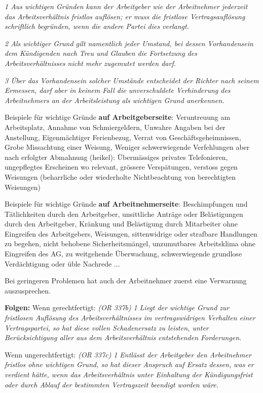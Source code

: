 \begin{description}
  \textit{1 Aus wichtigen Gründen kann der Arbeitgeber wie der Arbeitnehmer jederzeit das Arbeitsverhältnis fristlos auflösen; er muss die fristlose Vertragsauflösung schriftlich begründen, wenn die andere Partei dies verlangt.}

  \textit{2 Als wichtiger Grund gilt namentlich jeder Umstand, bei dessen Vorhandensein dem Kündigenden nach Treu und Glauben die Fortsetzung des Arbeitsverhältnisses nicht mehr zugemutet werden darf.}

  \textit{3 Über das Vorhandensein solcher Umstände entscheidet der Richter nach seinem Ermessen, darf aber in keinem Fall die unverschuldete Verhinderung des Arbeitnehmers an der Arbeitsleistung als wichtigen Grund anerkennen.}

  Beispiele für wichtige Gründe \textbf{auf Arbeitgeberseite}: Veruntreuung am Arbeitsplatz, Annahme von Schmiergeldern, Unwahre Angaben bei der Anstellung, Eigenmächtiger Ferienbezug, Verrat von Geschäftsgeheimnissen, Grobe Missachtung einer Weisung, Weniger schwerwiegende Verfehlungen aber nach erfolgter Abmahnung (heikel): Übermässiges privates Telefonieren, ungepflegtes Erscheinen wo relevant, grössere Verspätungen, verstoss gegen Weisungen (beharrliche oder wiederholte Nichtbeachtung von berechtigten Weisungen)

  Beispiele für wichtige Gründe \textbf{auf Arbeitnehmerseite}: Beschimpfungen und Tätlichkeiten durch den Arbeitgeber, unsittliche Anträge oder Belästigungen durch den Arbeitgeber, Kränkung und Belästigung durch Mitarbeiter ohne Eingreifen des Arbeitgebers, Weisungen, sittenwidrige oder strafbare Handlungen zu begehen, nicht behobene Sicherheitsmängel, unzumutbares Arbeitsklima ohne Eingreifen des AG, zu weitgehende Überwachung, schwerwiegende grundlose Verdächtigung oder üble Nachrede ... 
  
  Bei geringeren Problemen hat auch der Arbeitnehmer zuerst eine Verwarnung auszusprechen.

  \textbf{Folgen:} Wenn gerechtfertigt: \textit{(OR 337b)} \textit{1 Liegt der wichtige Grund zur fristlosen Auflösung des Arbeitsverhältnisses im vertragswidrigen Verhalten einer Vertragspartei, so hat diese vollen Schadenersatz zu leisten, unter Berücksichtigung aller aus dem Arbeitsverhältnis entstehenden Forderungen.}

  Wenn ungerechtfertigt: \textit{(OR 337c)} \textit{1 Entlässt der Arbeitgeber den Arbeitnehmer fristlos ohne wichtigen Grund, so hat dieser Anspruch auf Ersatz dessen, was er verdient hätte, wenn das Arbeitsverhältnis unter Einhaltung der Kündigungsfrist oder durch Ablauf der bestimmten Vertragszeit beendigt worden wäre.}


\end{description}
